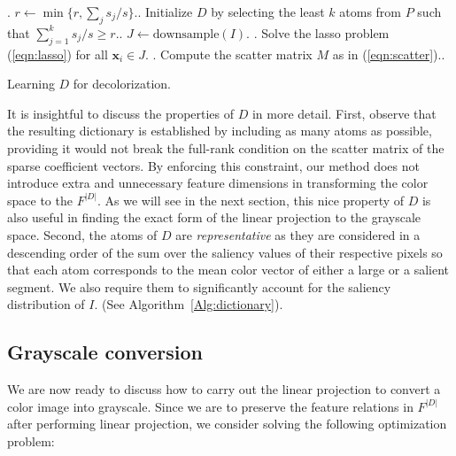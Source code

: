 \begin{algorithm}[tH]
\DontPrintSemicolon %
\SetAlgoLined %
\Input{An image $I=\{\mathbf{x}_i\}$ of tatal saliency value $s$,
a sorted list $P=\{\mathbf{m}_j\}$ with its corresponding $\{s_j\}$,
and a parameter $ r \in (0.5,1]$.}%
. $r \leftarrow \min\{r, {\sum_j s_j}/s\}$.. Initialize $D$ by selecting the least $k$ atoms from $P$ such that $\sum_{j=1}^k s_j/s \ge r$.. $J \leftarrow \mathrm{downsample}(I)$. . Solve the lasso problem (\ref{eqn:lasso}) for all $\mathbf{x}_i \in J$. . Compute the scatter matrix $M$ as in (\ref{eqn:scatter}).. 
\caption{Learning $D$ for decolorization. \label{Alg:dictionary}}
\end{algorithm}



It is insightful to discuss the properties of $D$ in more detail. 
First, observe that the resulting dictionary is established by including 
as many atoms as possible, 
providing it would not break the full-rank condition on the scatter matrix of the sparse coefficient vectors. By enforcing this constraint, 
our method does not introduce extra and unnecessary feature dimensions 
in transforming the color space to the $F^{|D|}$. 
As we will see in the next section, 
this nice property of $D$ is also useful in finding the exact form of 
the linear projection to the grayscale space. 
Second, the atoms of $D$ are {\em representative} as they are considered 
in a descending order of the sum over the saliency values of their respective pixels 
so that each atom corresponds to the mean color vector of 
either a large or a salient segment. 
We also require them to significantly account for the saliency distribution of $I$. 
(See Algorithm~\ref{Alg:dictionary}).

%
\subsection{Grayscale conversion}
\label{sec:grayscale}
%

We are now ready to discuss how to carry out the linear projection 
to convert a color image into grayscale. 
Since we are to preserve the feature relations in $F^{|D|}$ after performing 
linear projection, we consider solving the following optimization problem:

